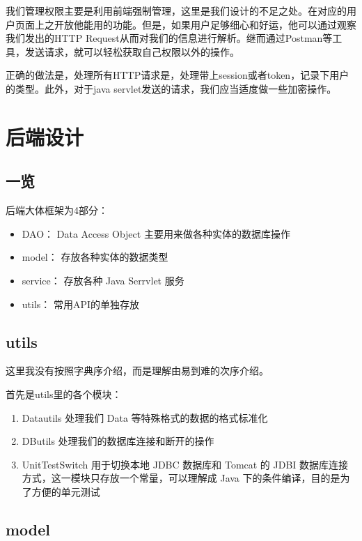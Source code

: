 \documentclass[../report.tex]{subfiles}
\begin{document}
我们管理权限主要是利用前端强制管理，这里是我们设计的不足之处。在对应的用户页面上之开放他能用的功能。但是，如果用户足够细心和好运，他可以通过观察我们发出的HTTP Request从而对我们的信息进行解析。继而通过Postman等工具，发送请求，就可以轻松获取自己权限以外的操作。

正确的做法是，处理所有HTTP请求是，处理带上session或者token，记录下用户的类型。此外，对于java servlet发送的请求，我们应当适度做一些加密操作。

\section{后端设计}

\subsection{一览}

后端大体框架为4部分：
\begin{itemize}
\itemsep -0.3em
\ttfamily
\item DAO： Data Access Object 主要用来做各种实体的数据库操作 
\item model： 存放各种实体的数据类型
\item service： 存放各种 Java Serrvlet 服务
\item utils： 常用API的单独存放
\end{itemize}

\subsection{utils}

这里我没有按照字典序介绍，而是理解由易到难的次序介绍。

首先是utils里的各个模块：

\begin{enumerate}
\itemsep 0em
\ttfamily 
\item Datautils 处理我们 Data 等特殊格式的数据的格式标准化
\item DButils 处理我们的数据库连接和断开的操作
\item UnitTestSwitch 用于切换本地 JDBC 数据库和 Tomcat 的 JDBI 数据库连接方式，这一模块只存放一个常量，可以理解成 Java 下的条件编译，目的是为了方便的单元测试
\end{enumerate}

\subsection{model}
\end{document}
